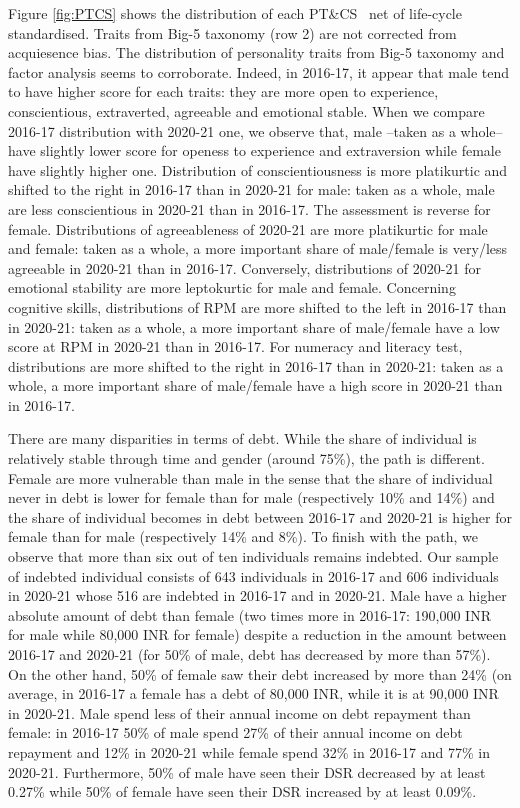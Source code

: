 \documentclass[a4paper, 11pt, onecolumn]{article}
\newcommand{\PTCS}{PT\&CS}
\begin{document}
Figure \ref{fig:PTCS} shows the distribution of each \PTCS~ net of life-cycle standardised.
Traits from Big-5 taxonomy (row 2) are not corrected from acquiesence bias.
The distribution of personality traits from Big-5 taxonomy and factor analysis seems to corroborate.
Indeed, in 2016-17, it appear that male tend to have higher score for each traits: they are more open to experience, conscientious, extraverted, agreeable and emotional stable.
When we compare 2016-17 distribution with 2020-21 one, we observe that, male --taken as a whole-- have slightly lower score for openess to experience and extraversion while female have slightly higher one.
Distribution of conscientiousness is more platikurtic and shifted to the right in 2016-17 than in 2020-21 for male: taken as a whole, male are less conscientious in 2020-21 than in 2016-17.
The assessment is reverse for female.
Distributions of agreeableness of 2020-21 are more platikurtic for male and female: taken as a whole, a more important share of male/female is very/less agreeable in 2020-21 than in 2016-17.
Conversely, distributions of 2020-21 for emotional stability are more leptokurtic for male and female.
Concerning cognitive skills, distributions of RPM are more shifted to the left in 2016-17 than in 2020-21: taken as a whole, a more important share of male/female have a low score at RPM in 2020-21 than in 2016-17.
For numeracy and literacy test, distributions are more shifted to the right in 2016-17 than in 2020-21: taken as a whole, a more important share of male/female have a high score in 2020-21 than in 2016-17.

There are many disparities in terms of debt.
While the share of individual is relatively stable through time and gender (around 75\%), the path is different.
Female are more vulnerable than male in the sense that the share of individual never in debt is lower for female than for male (respectively 10\% and 14\%) and the share of individual becomes in debt between 2016-17 and 2020-21 is higher for female than for male (respectively 14\% and 8\%).
To finish with the path, we observe that more than six out of ten individuals remains indebted.
Our sample of indebted individual consists of 643 individuals in 2016-17 and 606 individuals in 2020-21 whose 516 are indebted in 2016-17 and in 2020-21.
Male have a higher absolute amount of debt than female (two times more in 2016-17: 190,000 INR for male while 80,000 INR for female) despite a reduction in the amount between 2016-17 and 2020-21 (for 50\% of male, debt has decreased by more than 57\%).
On the other hand, 50\% of female saw their debt increased by more than 24\% (on average, in 2016-17 a female has a debt of 80,000 INR, while it is at 90,000 INR in 2020-21.
Male spend less of their annual income on debt repayment than female: in 2016-17 50\% of male spend 27\% of their annual income on debt repayment and 12\% in 2020-21 while female spend 32\% in 2016-17 and 77\% in 2020-21.
Furthermore, 50\% of male have seen their DSR decreased by at least 0.27\% while 50\% of female have seen their DSR increased by at least 0.09\%.
\end{document}
